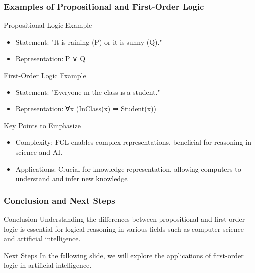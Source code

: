 \documentclass[aspectratio=169]{beamer}
\begin{document}
\begin{frame}[fragile]
    \frametitle{Examples of Propositional and First-Order Logic}
    
    \begin{block}{Propositional Logic Example}
        \begin{itemize}
            \item Statement: "It is raining (P) or it is sunny (Q)."
            \item Representation: P ∨ Q
        \end{itemize}
    \end{block}
    
    \begin{block}{First-Order Logic Example}
        \begin{itemize}
            \item Statement: "Everyone in the class is a student."
            \item Representation: ∀x (InClass(x) ⇒ Student(x))
        \end{itemize}
    \end{block}
    
    \begin{block}{Key Points to Emphasize}
        \begin{itemize}
            \item Complexity: FOL enables complex representations, beneficial for reasoning in science and AI.
            \item Applications: Crucial for knowledge representation, allowing computers to understand and infer new knowledge.
        \end{itemize}
    \end{block}
\end{frame}

\begin{frame}[fragile]
    \frametitle{Conclusion and Next Steps}
    
    \begin{block}{Conclusion}
        Understanding the differences between propositional and first-order logic is essential for logical reasoning in various fields such as computer science and artificial intelligence.
    \end{block}
    
    \begin{block}{Next Steps}
        In the following slide, we will explore the applications of first-order logic in artificial intelligence.
    \end{block}
\end{frame}
\end{document}
